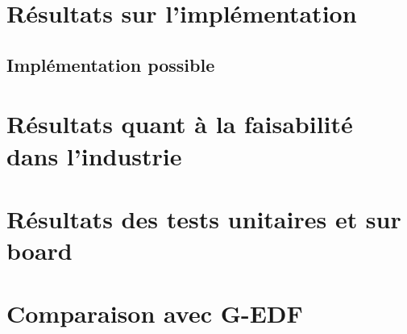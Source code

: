 
\section{Résultats sur l'implémentation}
	\subsection{Implémentation possible}

\section{Résultats quant à la faisabilité dans l'industrie}

\section{Résultats des tests unitaires et sur board}

\section{Comparaison avec G-EDF}
